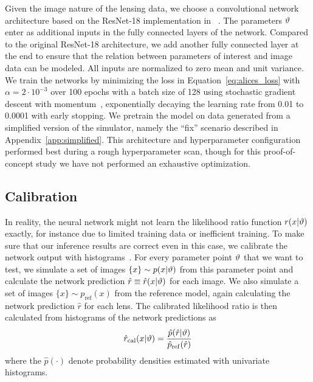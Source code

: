 \documentclass[twocolumn]{aastex63}
\begin{document}
Given the image nature of the lensing data, we choose a convolutional network architecture based on the ResNet-18 \citep{he2016deep} implementation in ~\citep{paszke2017automatic}. The parameters $\vartheta$ enter as additional inputs in the fully connected layers of the network. Compared to the original ResNet-18 architecture, we add another fully connected layer at the end to ensure that the relation between parameters of interest and image data can be modeled. All inputs are normalized to zero mean and unit variance. We train the networks by minimizing the loss in Equation~\eqref{eq:alices_loss} with $\alpha = 2 \cdot 10^{-3}$ over 100 epochs with a batch size of 128 using stochastic gradient descent with momentum~\citep{Qian:1999:MTG:307343.307376}, exponentially decaying the learning rate from 0.01 to 0.0001 with early stopping. We pretrain the model on data generated from a simplified version of the simulator, namely the ``fix'' scenario described in Appendix~\ref{app:simplified}. This architecture and hyperparameter configuration performed best during a rough hyperparameter scan, though for this proof-of-concept study we have not performed an exhaustive optimization.

\subsection{Calibration}
\label{sec:lfi-calibration}

In reality, the neural network might not learn the likelihood ratio function $r(x|\vartheta)$ exactly, for instance due to limited training data or inefficient training. To make sure that our inference results are correct even in this case, we calibrate the network output with histograms~\citep{Cranmer:2015bka, 1805.00020}. For every parameter point $\vartheta$ that we want to test, we simulate a set of images $\{x\} \sim p(x|\vartheta)$ from this parameter point and calculate the network prediction $\hat{r} \equiv \hat{r}(x|\vartheta)$ for each image. We also simulate a set of images $\{x\} \sim p_{\mathrm{ref}}(x)$ from the reference model, again calculating the network prediction $\hat{r}$ for each lens. The calibrated likelihood ratio is then calculated from histograms of the network predictions as
%
\begin{equation}
  \hat{r}_\mathrm{cal}(x|\stattheta)
  = \frac {\hat{p}( \hat{r} | \stattheta )} {\hat{p}_\mathrm{ref}(\hat{r})}
\end{equation}
%
where the $\hat{p}(\cdot)$ denote probability densities estimated with univariate histograms.
\end{document}
